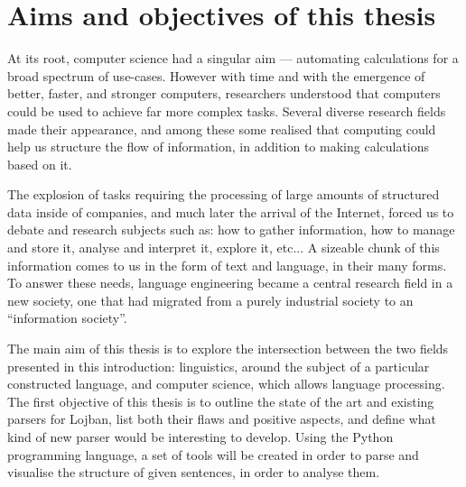 \chapter{Aims and objectives of this thesis}

At its root, computer science had a singular aim --- automating calculations for a broad spectrum of use-cases.
However with time and with the emergence of better, faster, and stronger computers, researchers understood that computers could be used to achieve
far more complex tasks. Several diverse research fields made their appearance, and among these some realised that computing could help us structure the
flow of information, in addition to making calculations based on it. \newline

The explosion of tasks requiring the processing of large amounts of structured data inside of companies, and much later the arrival of the Internet,
forced us to debate and research subjects such as: how to gather information, how to manage and store it, analyse and interpret it, explore it, etc...
A sizeable chunk of this information comes to us in the form of text and language, in their many forms. To answer these needs, language engineering became a
central research field in a new society, one that had migrated from a purely industrial society to an ``information society''.\newline

The main aim of this thesis is to explore the intersection between the two fields presented in this introduction: linguistics, around the subject of a
particular constructed language, and computer science, which allows language processing. The first objective of this thesis is to outline the state of the
art and existing parsers for Lojban, list both their flaws and positive aspects, and define what kind of new parser would be interesting to develop.
Using the Python programming language, a set of tools will be created in order to parse and visualise the structure of given sentences, in order to analyse them.\newline